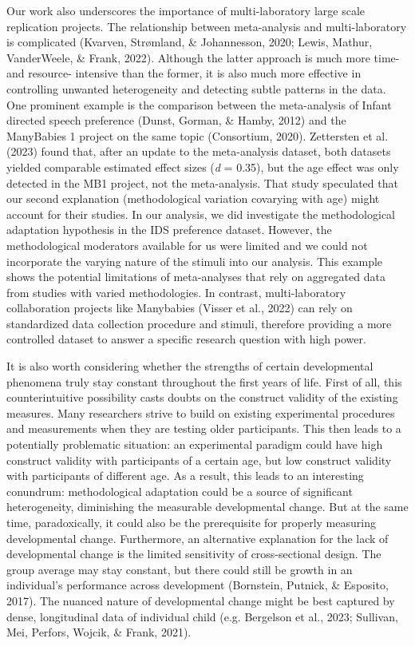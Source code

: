 \documentclass[
  man]{apa6}
\begin{document}
Our work also underscores the importance of multi-laboratory large scale replication projects. The relationship between meta-analysis and multi-laboratory is complicated (Kvarven, Strømland, \& Johannesson, 2020; Lewis, Mathur, VanderWeele, \& Frank, 2022). Although the latter approach is much more time- and resource- intensive than the former, it is also much more effective in controlling unwanted heterogeneity and detecting subtle patterns in the data. One prominent example is the comparison between the meta-analysis of Infant directed speech preference (Dunst, Gorman, \& Hamby, 2012) and the ManyBabies 1 project on the same topic (Consortium, 2020). Zettersten et al. (2023) found that, after an update to the meta-analysis dataset, both datasets yielded comparable estimated effect sizes (\emph{d} = 0.35), but the age effect was only detected in the MB1 project, not the meta-analysis. That study speculated that our second explanation (methodological variation covarying with age) might account for their studies. In our analysis, we did investigate the methodological adaptation hypothesis in the IDS preference dataset. However, the methodological moderators available for us were limited and we could not incorporate the varying nature of the stimuli into our analysis. This example shows the potential limitations of meta-analyses that rely on aggregated data from studies with varied methodologies. In contrast, multi-laboratory collaboration projects like Manybabies (Visser et al., 2022) can rely on standardized data collection procedure and stimuli, therefore providing a more controlled dataset to answer a specific research question with high power.

It is also worth considering whether the strengths of certain developmental phenomena truly stay constant throughout the first years of life. First of all, this counterintuitive possibility casts doubts on the construct validity of the existing measures. Many researchers strive to build on existing experimental procedures and measurements when they are testing older participants. This then leads to a potentially problematic situation: an experimental paradigm could have high construct validity with participants of a certain age, but low construct validity with participants of different age. As a result, this leads to an interesting conundrum: methodological adaptation could be a source of significant heterogeneity, diminishing the measurable developmental change. But at the same time, paradoxically, it could also be the prerequisite for properly measuring developmental change. Furthermore, an alternative explanation for the lack of developmental change is the limited sensitivity of cross-sectional design. The group average may stay constant, but there could still be growth in an individual's performance across development (Bornstein, Putnick, \& Esposito, 2017). The nuanced nature of developmental change might be best captured by dense, longitudinal data of individual child (e.g. Bergelson et al., 2023; Sullivan, Mei, Perfors, Wojcik, \& Frank, 2021).
\end{document}
